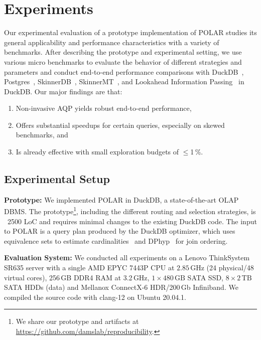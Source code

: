 \section{Experiments}
\label{experiments}

Our experimental evaluation of a prototype implementation of POLAR studies its general applicability and performance characteristics with a variety of benchmarks. After describing the prototype and experimental setting, we use various micro benchmarks to evaluate the behavior of different strategies and parameters and conduct end-to-end performance comparisons with DuckDB~\cite{RaasveldtM19}, Postgres~\cite{DBLP:conf/sigmod/StonebrakerR86}, SkinnerDB~\cite{TrummerWMMJA19, TrummerWWMMJAR21}, SkinnerMT~\cite{WeiT22}, and Lookahead Information Passing~\cite{ZhuPSP17} in DuckDB. Our major findings are that: 
\begin{enumerate}
\item Non-invasive AQP yields robust end-to-end performance,
\item Offers substantial speedups for certain queries, especially on skewed benchmarks, and
\item Is already effective with small exploration budgets of $\leq$1\,\%. 
\end{enumerate}

\subsection{Experimental Setup}

\textbf{Prototype:} We implemented POLAR in DuckDB, a state-of-the-art OLAP DBMS. The prototype\footnote{We share our prototype and artifacts at \url{https://github.com/damslab/reproducibility}.}, including the different routing and selection strategies, is ~2500 LoC and requires minimal changes to the existing DuckDB code. The input to POLAR is a query plan produced by the DuckDB optimizer, which uses equivalence sets to estimate cardinalities~\cite{thesis/Ebergen22} and DPhyp~\cite{MoerkotteN08} for join ordering.  

\textbf{Evaluation System:} We conducted all experiments on a Lenovo ThinkSystem SR635 server with a single AMD EPYC 7443P CPU at $2.85$\,GHz (24 physical/48 virtual cores), 256\,GB DDR4 RAM at 3.2\,GHz, $1\times 480\,\text{GB}$ SATA SSD, $8\times 2\,\text{TB}$ SATA HDDs (data) and Mellanox ConnectX-6 HDR/200\,Gb Infiniband. We compiled the source code with clang-12 on Ubuntu 20.04.1.

